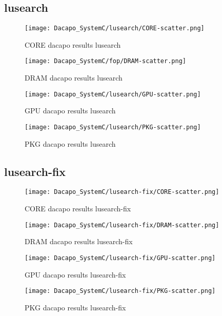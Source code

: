 \documentclass{article}
\begin{document}
\subsection{lusearch}
    \begin{figure}[H]
    	\centering
    	\texttt{[image: Dacapo\_SystemC/lusearch/CORE-scatter.png]}
    	\caption{CORE dacapo results lusearch}
    	\label{fig:lusearch-CORE}
    \end{figure}
    \begin{figure}[H]
    	\centering
    	\texttt{[image: Dacapo\_SystemC/fop/DRAM-scatter.png]}
    	\caption{DRAM dacapo results lusearch}
    	\label{fig:fop-DRAM}
    \end{figure}
    \begin{figure}[H]
    	\centering
    	\texttt{[image: Dacapo\_SystemC/lusearch/GPU-scatter.png]}
    	\caption{GPU dacapo results lusearch}
    	\label{fig:lusearch-GPU}
    \end{figure}
    \begin{figure}[H]
    	\centering
    	\texttt{[image: Dacapo\_SystemC/lusearch/PKG-scatter.png]}
    	\caption{PKG dacapo results lusearch}
    	\label{fig:lusearch-PKG}
    \end{figure}
    
\subsection{lusearch-fix}
    \begin{figure}[H]
    	\centering
    	\texttt{[image: Dacapo\_SystemC/lusearch-fix/CORE-scatter.png]}
    	\caption{CORE dacapo results lusearch-fix}
    	\label{fig:lusearch-fix-CORE}
    \end{figure}
    \begin{figure}[H]
    	\centering
    	\texttt{[image: Dacapo\_SystemC/lusearch-fix/DRAM-scatter.png]}
    	\caption{DRAM dacapo results lusearch-fix}
    	\label{fig:lusearch-fix-DRAM}
    \end{figure}
    \begin{figure}[H]
    	\centering
    	\texttt{[image: Dacapo\_SystemC/lusearch-fix/GPU-scatter.png]}
    	\caption{GPU dacapo results lusearch-fix}
    	\label{fig:lusearch-fix-GPU}
    \end{figure}
    \begin{figure}[H]
    	\centering
    	\texttt{[image: Dacapo\_SystemC/lusearch-fix/PKG-scatter.png]}
    	\caption{PKG dacapo results lusearch-fix}
    	\label{fig:lusearch-fix-PKG}
    \end{figure}
\end{document}
